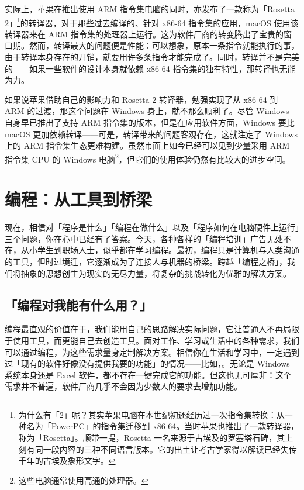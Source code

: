 实际上，苹果在推出使用 ARM 指令集电脑的同时，亦发布了一款称为「Rosetta 2」\footnote{为什么有「2」呢？其实苹果电脑在本世纪初还经历过一次指令集转换：从一种名为「PowerPC」的指令集迁移到 x86-64。当时苹果也推出了一款转译器，称为「Rosetta」。顺带一提，Rosetta 一名来源于古埃及的罗塞塔石碑，其上刻有同一段内容的三种不同语言版本。它的出土让考古学家得以解读已经失传千年的古埃及象形文字。}的转译器，对于那些过去编译的、针对 x86-64 指令集的应用，macOS 使用该转译器来在 ARM 指令集的处理器上运行。这为软件厂商的转变腾出了宝贵的窗口期。然而，转译最大的问题便是性能：可以想象，原本一条指令就能执行的事，由于转译本身存在的开销，就要用许多条指令才能完成了。同时，转译并不是完美的——如果一些软件的设计本身就依赖 x86-64 指令集的独有特性，那转译也无能为力。

如果说苹果借助自己的影响力和 Rosetta 2 转译器，勉强实现了从 x86-64 到 ARM 的过渡，那这个问题在 Windows 身上，就不那么顺利了。尽管 Windows 自身早已推出了支持 ARM 指令集的版本，但是在应用软件方面，Windows 要比 macOS 更加依赖转译——可是，转译带来的问题客观存在，这就注定了 Windows 上的 ARM 指令集生态更难构建。虽然市面上如今已经可以见到少量采用 ARM 指令集 CPU 的 Windows 电脑\footnote{这些电脑通常使用高通的处理器。}，但它们的使用体验仍然有比较大的进步空间。

\section{编程：从工具到桥梁}

现在，相信对「程序是什么」「编程在做什么」以及「程序如何在电脑硬件上运行」三个问题，你在心中已经有了答案。今天，各种各样的「编程培训」广告无处不在，从小学生到职场人士，似乎都在学习编程。最初，编程只是计算机与人类沟通的工具，但时过境迁，它逐渐成为了连接人与机器的桥梁。跨越「编程之桥」，我们将抽象的思想创生为现实的无尽力量，将复杂的挑战转化为优雅的解决方案。

\subsection{「编程对我能有什么用？」}

编程最直观的价值在于，我们能用自己的思路解决实际问题，它让普通人不再局限于使用工具，而更能自己去创造工具。面对工作、学习或生活中的各种需求，我们可以通过编程，为这些需求量身定制解决方案。相信你在生活和学习中，一定遇到过「现有的软件好像没有提供我要的功能」的情况——比如，。无论是 Windows 系统本身还是 Excel 软件，都不存在一键完成它的功能。但这也无可厚非：这个需求并不普遍，软件厂商几乎不会因为少数人的要求去增加功能。

